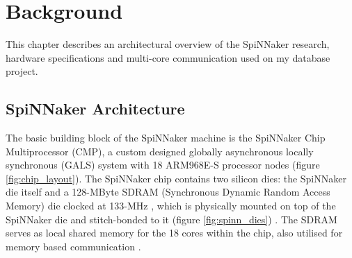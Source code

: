 \chapter{Background}
\label{cha:background}
This chapter describes an architectural overview of the SpiNNaker research, hardware specifications and multi-core communication used on my database project.

\section{SpiNNaker Architecture}
\label{sec:spinn_arch}

The basic building block of the SpiNNaker machine is the SpiNNaker Chip Multiprocessor (CMP), a custom designed globally asynchronous locally synchronous (GALS) system \cite{painkras} with 18 ARM968E-S processor nodes \cite{impacttraffic} (figure \ref{fig:chip_layout}). 
The SpiNNaker chip contains two silicon dies: the SpiNNaker die itself and a 128-MByte SDRAM (Synchronous Dynamic Random Access Memory) die clocked at 133-MHz \cite{gals}, which is physically mounted on top of the SpiNNaker die and stitch-bonded to it (figure \ref{fig:spinn_dies}) \cite{spinnchip}. The SDRAM serves as local shared memory for the 18 cores within the chip, also utilised for memory based communication \cite{datasheet}. 

